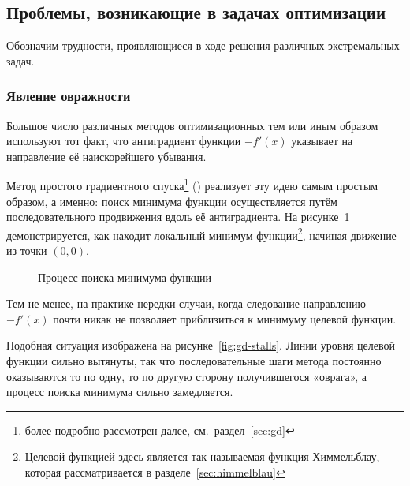\subsection{Проблемы, возникающие в задачах оптимизации}
Обозначим трудности, проявляющиеся в ходе решения различных
экстремальных задач.

\subsubsection{Явление овражности}
\label{sec:problems-ill}

Большое число различных методов оптимизационных тем или иным образом
используют тот факт, что антиградиент функции $-f'(x)$ указывает на
направление её наискорейшего убывания.

Метод простого градиентного спуска\footnote{\gd{} более подробно
  рассмотрен далее, см. раздел \ref{sec:gd}} (\gd{}) реализует эту
идею самым простым образом, а именно: поиск минимума функции
осуществляется путём последовательного продвижения вдоль её
антиградиента. На рисунке \ref{fig:gd-works} демонстрируется, как
\gd{} находит локальный минимум функции\footnote{Целевой функцией
  здесь является так называемая функция Химмельблау, которая
  рассматривается в разделе \ref{sec:himmelblau}}, начиная движение из
точки $(0, 0)$.

\begin{figure}[!thb]
  \centering
  \caption{Процесс поиска минимума функции}
  \label{fig:gd-works}
\end{figure}

Тем не менее, на практике нередки случаи, когда следование направлению
$-f'(x)$ почти никак не позволяет приблизиться к минимуму целевой
функции.

Подобная ситуация изображена на рисунке \ref{fig:gd-stalls}. Линии
уровня целевой функции сильно вытянуты, так что последовательные шаги
метода \gd{} постоянно оказываются то по одну, то по другую сторону
получившегося «оврага», а процесс поиска минимума сильно замедляется.

